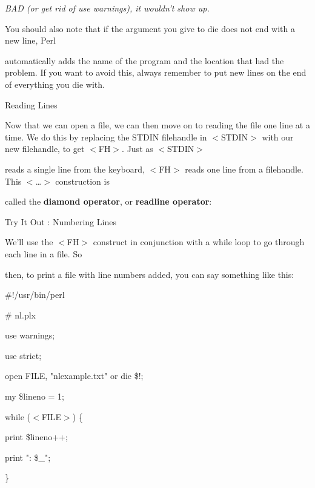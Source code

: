 \documentclass[a4paper,11pt]{book}
\begin{document}
\noindent \textit{BAD (or get rid of use warnings), it wouldn't show up.}

\noindent 

\noindent You should also note that if the argument you give to die does not end with a new line, Perl

\noindent automatically adds the name of the program and the location that had the problem. If you want to avoid this, always remember to put new lines on the end of everything you die with.

\noindent 

\noindent Reading Lines

\noindent 

\noindent Now that we can open a file, we can then move on to reading the file one line at a time. We do this by replacing the STDIN filehandle in $<$STDIN$>$ with our new filehandle, to get $<$FH$>$. Just as $<$STDIN$>$

\noindent reads a single line from the keyboard, $<$FH$>$ reads one line from a filehandle. This $<$\dots $>$ construction is

\noindent called the \textbf{diamond operator}, or \textbf{readline operator}:

\noindent 

\noindent Try It Out : Numbering Lines

\noindent 

\noindent We'll use the $<$FH$>$ construct in conjunction with a while loop to go through each line in a file. So

\noindent then, to print a file with line numbers added, you can say something like this:

\noindent 

\noindent \#!/usr/bin/perl

\noindent \# nl.plx

\noindent use warnings;

\noindent use strict;

\noindent 

\noindent open FILE, "nlexample.txt" or die \$!;

\noindent my \$lineno = 1;

\noindent 

\noindent while ($<$FILE$>$) \{

\noindent print \$lineno++;

\noindent print ": \$\_";

\noindent \}

\noindent 
\end{document}
